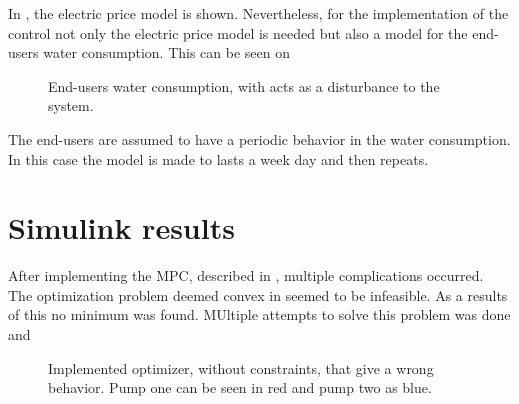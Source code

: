 In , the electric price model is shown. Nevertheless, for the implementation of the control not only the electric price model is needed but also a model for the end-users water consumption. This can be seen on 

\begin{figure}[H]
\centering
 
\caption{End-users water consumption, with acts as a disturbance to the system.}
\label{fig:water_consumption}
\end{figure}

The end-users are assumed to have a periodic behavior in the water consumption. In this case the model is made to lasts a week day and then repeats. 


\section{Simulink results}

After implementing the MPC, described in , multiple complications occurred. The optimization problem deemed convex in  seemed to be infeasible. As a results of this no minimum was found. MUltiple attempts to solve this problem was done and 


\begin{figure}[H]
\centering
 
\caption{Implemented optimizer, without constraints, that give a wrong behavior. Pump one can be seen in red and pump two as blue.}
\label{fig:Implementation_shit}
\end{figure}
